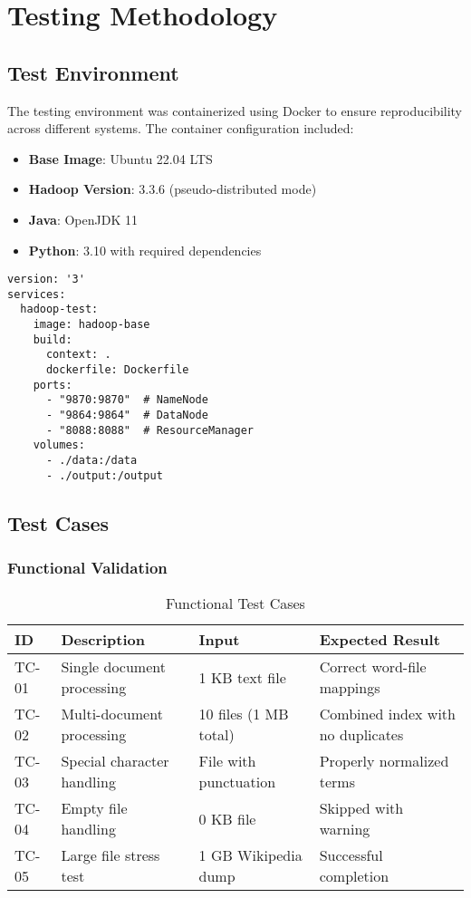 \section{Testing Methodology}\label{sec:testing}

\subsection{Test Environment}\label{subsec:test-environment}

The testing environment was containerized using Docker to ensure reproducibility across different systems. The container configuration included:

\begin{itemize}
    \item \textbf{Base Image}: Ubuntu 22.04 LTS
    \item \textbf{Hadoop Version}: 3.3.6 (pseudo-distributed mode)
    \item \textbf{Java}: OpenJDK 11
    \item \textbf{Python}: 3.10 with required dependencies
\end{itemize}

\begin{lstlisting}[style=bashstyle,caption={Docker Compose Configuration},label={lst:docker-compose}]
version: '3'
services:
  hadoop-test:
    image: hadoop-base
    build:
      context: .
      dockerfile: Dockerfile
    ports:
      - "9870:9870"  # NameNode
      - "9864:9864"  # DataNode
      - "8088:8088"  # ResourceManager
    volumes:
      - ./data:/data
      - ./output:/output
\end{lstlisting}

\subsection{Test Cases}\label{subsec:test-cases}

\subsubsection{Functional Validation}
\begin{table}[H]
    \centering
    \caption{Functional Test Cases}
    \begin{tabular}{llll}
        \toprule
        \textbf{ID} & \textbf{Description} & \textbf{Input} & \textbf{Expected Result} \\
        \midrule
        TC-01 & Single document processing & 1 KB text file & Correct word-file mappings \\
        TC-02 & Multi-document processing & 10 files (1 MB total) & Combined index with no duplicates \\
        TC-03 & Special character handling & File with punctuation & Properly normalized terms \\
        TC-04 & Empty file handling & 0 KB file & Skipped with warning \\
        TC-05 & Large file stress test & 1 GB Wikipedia dump & Successful completion \\
        \bottomrule
    \end{tabular}
    \label{tab:functional-tests}
\end{table}

